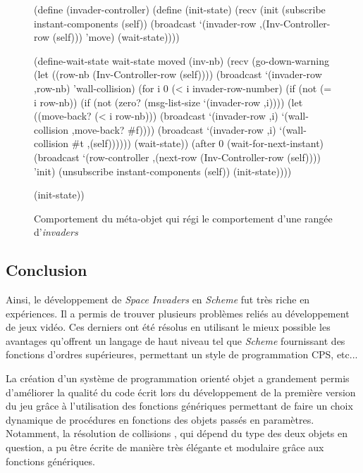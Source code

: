 \documentclass[12pt,twoside,letterpaper,francais]{book}
\newcommand{\si}{{\textit{Space Invaders }}}
\newcommand{\Schemelang}{{\textit{Scheme }}}
\newcommand{\scheme}[1]{\selectlanguage{english}{\tt #1}\selectlanguage{french}}
\begin{document}
\begin{figure}[htb!]
  \begin{schemecode}
(define (invader-controller)
  (define (init-state)
    (recv
     (init
      (subscribe instant-components (self))
      (broadcast `(invader-row ,(Inv-Controller-row (self)))
                 'move)
      (wait-state))))

  (define-wait-state wait-state moved (inv-nb)
    (recv
     (go-down-warning
      (let ((row-nb (Inv-Controller-row (self))))
        (broadcast `(invader-row ,row-nb) 'wall-collision)
        (for i 0 (< i invader-row-number)
             (if (not (= i row-nb))
                 (if (not (zero? (msg-list-size `(invader-row ,i))))
                     (let ((move-back? (< i row-nb)))
                       (broadcast `(invader-row ,i)
                                  `(wall-collision ,move-back? \#f))))
                 (broadcast `(invader-row ,i)
                            `(wall-collision  \#t ,(self))))))
      (wait-state))
     (after 0
            (wait-for-next-instant)
            (broadcast `(row-controller
                         ,(next-row (Inv-Controller-row (self))))
                       'init)
            (unsubscribe instant-components (self))
            (init-state))))

  (init-state))
  \end{schemecode}
  \caption{Comportement du méta-objet \scheme{invader-controller} qui
    régi le comportement d'une rangée d'\textit{invaders}}
  \label{Exp:inv-cnt}
\end{figure}


\FloatBarrier
\subsection{Conclusion}
Ainsi, le développement de \si en \Schemelang fut très riche en
expériences. Il a permis de trouver plusieurs problèmes reliés au
développement de jeux vidéo. Ces derniers ont été résolus en utilisant
le mieux possible les avantages qu'offrent un langage de haut niveau
tel que \Schemelang fournissant des fonctions d'ordres supérieures,
permettant un style de programmation CPS, etc...

La création d'un système de programmation orienté objet a grandement
permis d'améliorer la qualité du code écrit lors du développement de
la première version du jeu grâce à l'utilisation des fonctions
génériques permettant de faire un choix dynamique de procédures en
fonctions des objets passés en paramètres. Notamment, la résolution de
collisions , qui dépend du type des deux objets en question, a pu être
écrite de manière très élégante et modulaire grâce aux fonctions
génériques.
\end{document}
